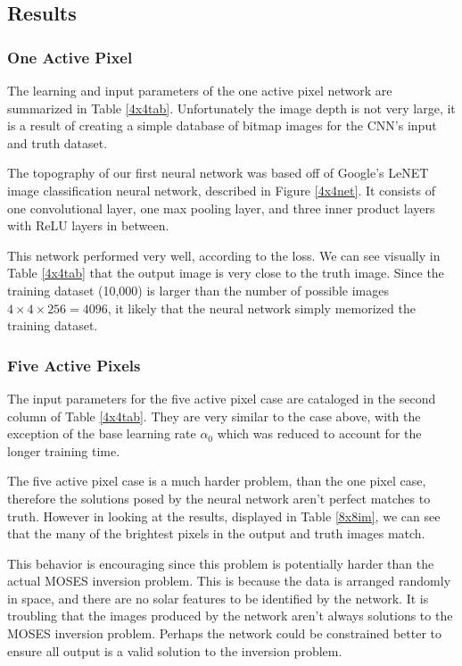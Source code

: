 \documentclass[twoside]{article}
\begin{document}
\begin{multicols}{2}
\subsection{Results}
\subsubsection{One Active Pixel}
The learning and input parameters of the one active pixel network are summarized in Table \ref{4x4tab}. Unfortunately the image depth is not very large, it is a result of creating a simple database of bitmap images for the CNN's input and truth dataset. \par The topography of our first neural network was based off of Google's LeNET image classification neural network, described in Figure \ref{4x4net}. It consists of one convolutional layer, one max pooling layer, and three inner product layers with ReLU layers in between. \par This network performed very well, according to the loss. We can see visually in Table \ref{4x4tab} that the output image is very close to the truth image. Since the training dataset (10,000) is larger than the number of possible images $4 \times 4 \times 256 = 4096$, it likely that the neural network simply memorized the training dataset.

\subsubsection{Five Active Pixels}

The input parameters for the five active pixel case are cataloged in the second column of Table \ref{4x4tab}.  They are very similar to the case above, with the exception of the base learning rate $\alpha_0$ which was reduced to account for the longer training time. \par The five active pixel case is a much harder problem, than the one pixel case, therefore the solutions posed by the neural network aren't perfect matches to truth. However in looking at the results, displayed in Table \ref{8x8im}, we can see that the many of the brightest pixels in the output and truth images match. \par This behavior is encouraging since this problem is potentially harder than the actual MOSES inversion problem. This is because the data is arranged randomly in space, and there are no solar features to be identified by the network. It is troubling that the images produced by the network aren't always solutions to the MOSES inversion problem. Perhaps the network could be constrained better to ensure all output is a valid solution to the inversion problem.


\end{multicols}
\end{document}

